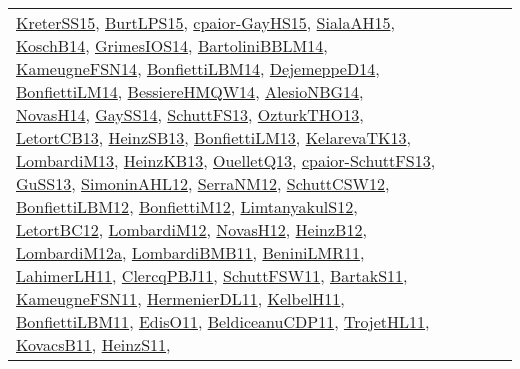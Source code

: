 {\begin{longtable}{lp{3cm}>{\raggedright}p{6cm}>{\raggedright}p{6cm}p{8cm}}
\href{papers/KreterSS15.pdf}{KreterSS15}\cite{KreterSS15}, \href{papers/BurtLPS15.pdf}{BurtLPS15}\cite{BurtLPS15}, \href{papers/cpaior-GayHS15.pdf}{cpaior-GayHS15}\cite{cpaior-GayHS15}, \href{papers/SialaAH15.pdf}{SialaAH15}\cite{SialaAH15}, \href{papers/KoschB14.pdf}{KoschB14}\cite{KoschB14}, \href{articles/GrimesIOS14.pdf}{GrimesIOS14}\cite{GrimesIOS14}, \href{papers/BartoliniBBLM14.pdf}{BartoliniBBLM14}\cite{BartoliniBBLM14}, \href{articles/KameugneFSN14.pdf}{KameugneFSN14}\cite{KameugneFSN14}, \href{articles/BonfiettiLBM14.pdf}{BonfiettiLBM14}\cite{BonfiettiLBM14}, \href{papers/DejemeppeD14.pdf}{DejemeppeD14}\cite{DejemeppeD14}, \href{papers/BonfiettiLM14.pdf}{BonfiettiLM14}\cite{BonfiettiLM14}, \href{papers/BessiereHMQW14.pdf}{BessiereHMQW14}\cite{BessiereHMQW14}, \href{papers/AlesioNBG14.pdf}{AlesioNBG14}\cite{AlesioNBG14}, \href{articles/NovasH14.pdf}{NovasH14}\cite{NovasH14}, \href{papers/GaySS14.pdf}{GaySS14}\cite{GaySS14}, \href{papers/SchuttFS13.pdf}{SchuttFS13}\cite{SchuttFS13}, \href{articles/OzturkTHO13.pdf}{OzturkTHO13}\cite{OzturkTHO13}, \href{papers/LetortCB13.pdf}{LetortCB13}\cite{LetortCB13}, \href{articles/HeinzSB13.pdf}{HeinzSB13}\cite{HeinzSB13}, \href{papers/BonfiettiLM13.pdf}{BonfiettiLM13}\cite{BonfiettiLM13}, \href{papers/KelarevaTK13.pdf}{KelarevaTK13}\cite{KelarevaTK13}, \href{papers/LombardiM13.pdf}{LombardiM13}\cite{LombardiM13}, \href{papers/HeinzKB13.pdf}{HeinzKB13}\cite{HeinzKB13}, \href{papers/OuelletQ13.pdf}{OuelletQ13}\cite{OuelletQ13}, \href{papers/cpaior-SchuttFS13.pdf}{cpaior-SchuttFS13}\cite{cpaior-SchuttFS13}, \href{papers/GuSS13.pdf}{GuSS13}\cite{GuSS13}, \href{papers/SimoninAHL12.pdf}{SimoninAHL12}\cite{SimoninAHL12}, \href{papers/SerraNM12.pdf}{SerraNM12}\cite{SerraNM12}, \href{papers/SchuttCSW12.pdf}{SchuttCSW12}\cite{SchuttCSW12}, \href{papers/BonfiettiLBM12.pdf}{BonfiettiLBM12}\cite{BonfiettiLBM12}, \href{papers/BonfiettiM12.pdf}{BonfiettiM12}\cite{BonfiettiM12}, \href{articles/LimtanyakulS12.pdf}{LimtanyakulS12}\cite{LimtanyakulS12}, \href{papers/LetortBC12.pdf}{LetortBC12}\cite{LetortBC12}, \href{articles/LombardiM12.pdf}{LombardiM12}\cite{LombardiM12}, \href{articles/NovasH12.pdf}{NovasH12}\cite{NovasH12}, \href{papers/HeinzB12.pdf}{HeinzB12}\cite{HeinzB12}, \href{articles/LombardiM12a.pdf}{LombardiM12a}\cite{LombardiM12a}, \href{papers/LombardiBMB11.pdf}{LombardiBMB11}\cite{LombardiBMB11}, \href{articles/BeniniLMR11.pdf}{BeniniLMR11}\cite{BeniniLMR11}, \href{papers/LahimerLH11.pdf}{LahimerLH11}\cite{LahimerLH11}, \href{papers/ClercqPBJ11.pdf}{ClercqPBJ11}\cite{ClercqPBJ11}, \href{articles/SchuttFSW11.pdf}{SchuttFSW11}\cite{SchuttFSW11}, \href{articles/BartakS11.pdf}{BartakS11}\cite{BartakS11}, \href{papers/KameugneFSN11.pdf}{KameugneFSN11}\cite{KameugneFSN11}, \href{papers/HermenierDL11.pdf}{HermenierDL11}\cite{HermenierDL11}, \href{articles/KelbelH11.pdf}{KelbelH11}\cite{KelbelH11}, \href{papers/BonfiettiLBM11.pdf}{BonfiettiLBM11}\cite{BonfiettiLBM11}, \href{papers/EdisO11.pdf}{EdisO11}\cite{EdisO11}, \href{articles/BeldiceanuCDP11.pdf}{BeldiceanuCDP11}\cite{BeldiceanuCDP11}, \href{articles/TrojetHL11.pdf}{TrojetHL11}\cite{TrojetHL11}, \href{articles/KovacsB11.pdf}{KovacsB11}\cite{KovacsB11}, \href{papers/HeinzS11.pdf}{HeinzS11}\cite{HeinzS11}, 
\end{longtable}}
